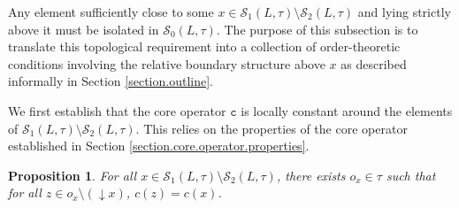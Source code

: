\documentclass{article}
\newcommand{\blue}{\color{blue}}
\newtheorem{proposition}[theorem]{Proposition}
\begin{document}
{
Any element sufficiently close to some \(x\in\mathcal S_1(L,\tau)\setminus\mathcal S_2(L,\tau)\) and lying strictly above it must be isolated in $\mathcal S_0(L,\tau)$. The purpose of this subsection is to translate this topological requirement into a collection of order-theoretic conditions involving the relative boundary structure above \(x\) as described informally in Section \ref{section.outline}. 

}


We first establish that the core operator \(\texttt{c}\) is locally constant around the elements of \(\mathcal{S}_1(L,\tau)\setminus\mathcal{S}_2(L,\tau)\). {This relies on the properties of the core operator established in Section \ref{section.core.operator.properties}.}


\begin{proposition}\label{proposition.locally.constant.points}
    For all $x \in \mathcal{S}_{1}(L,\tau) \setminus \mathcal{S}_{2}(L,\tau)$, there exists $o_x \in \tau$ such that for all $z \in o_x \setminus (\mathop{\downarrow}x)$, $c(z) = c(x)$.
\end{proposition}
\end{document}
